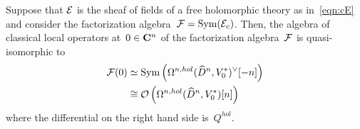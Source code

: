%

\begin{lem}
\label{lem:envelope}
Suppose that $\mathcal E$ is the sheaf of fields of a free holomorphic theory as in~\eqref{eqn:cE} and consider the factorization algebra~$\mathcal F = \operatorname{Sym}(\mathcal E_c)$. 
Then, the algebra of classical local operators at~$0 \in \mathbf{C}^n$ of the factorization algebra~$\mathcal F$ is quasi-isomorphic to 
\begin{align*}
\mathcal F(0) & \simeq {\rm Sym} \left(\Omega^{n,hol}(\widehat{D}^n,V_0^*)^\vee [-n]\right) \\ & \cong \mathcal O\left(\Omega^{n,hol}(\widehat{D}^n,V_0^*) [n] \right) 
\end{align*}
where the differential on the right hand side is~$Q^{hol}$.
\end{lem}

